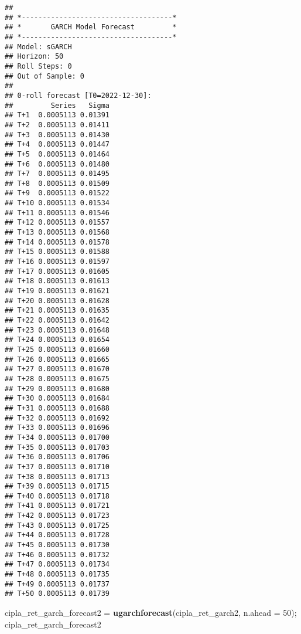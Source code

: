 \documentclass[
]{article}
\newenvironment{Shaded}{\begin{snugshade}}{\end{snugshade}}
\newcommand{\AttributeTok}[1]{\textcolor[rgb]{0.13,0.29,0.53}{#1}}
\newcommand{\DecValTok}[1]{\textcolor[rgb]{0.00,0.00,0.81}{#1}}
\newcommand{\FunctionTok}[1]{\textcolor[rgb]{0.13,0.29,0.53}{\textbf{#1}}}
\newcommand{\NormalTok}[1]{#1}
\newcommand{\OtherTok}[1]{\textcolor[rgb]{0.56,0.35,0.01}{#1}}
\begin{document}
\begin{verbatim}
## 
## *------------------------------------*
## *       GARCH Model Forecast         *
## *------------------------------------*
## Model: sGARCH
## Horizon: 50
## Roll Steps: 0
## Out of Sample: 0
## 
## 0-roll forecast [T0=2022-12-30]:
##         Series   Sigma
## T+1  0.0005113 0.01391
## T+2  0.0005113 0.01411
## T+3  0.0005113 0.01430
## T+4  0.0005113 0.01447
## T+5  0.0005113 0.01464
## T+6  0.0005113 0.01480
## T+7  0.0005113 0.01495
## T+8  0.0005113 0.01509
## T+9  0.0005113 0.01522
## T+10 0.0005113 0.01534
## T+11 0.0005113 0.01546
## T+12 0.0005113 0.01557
## T+13 0.0005113 0.01568
## T+14 0.0005113 0.01578
## T+15 0.0005113 0.01588
## T+16 0.0005113 0.01597
## T+17 0.0005113 0.01605
## T+18 0.0005113 0.01613
## T+19 0.0005113 0.01621
## T+20 0.0005113 0.01628
## T+21 0.0005113 0.01635
## T+22 0.0005113 0.01642
## T+23 0.0005113 0.01648
## T+24 0.0005113 0.01654
## T+25 0.0005113 0.01660
## T+26 0.0005113 0.01665
## T+27 0.0005113 0.01670
## T+28 0.0005113 0.01675
## T+29 0.0005113 0.01680
## T+30 0.0005113 0.01684
## T+31 0.0005113 0.01688
## T+32 0.0005113 0.01692
## T+33 0.0005113 0.01696
## T+34 0.0005113 0.01700
## T+35 0.0005113 0.01703
## T+36 0.0005113 0.01706
## T+37 0.0005113 0.01710
## T+38 0.0005113 0.01713
## T+39 0.0005113 0.01715
## T+40 0.0005113 0.01718
## T+41 0.0005113 0.01721
## T+42 0.0005113 0.01723
## T+43 0.0005113 0.01725
## T+44 0.0005113 0.01728
## T+45 0.0005113 0.01730
## T+46 0.0005113 0.01732
## T+47 0.0005113 0.01734
## T+48 0.0005113 0.01735
## T+49 0.0005113 0.01737
## T+50 0.0005113 0.01739
\end{verbatim}

\begin{Shaded}
\begin{Highlighting}[]
\NormalTok{cipla\_ret\_garch\_forecast2 }\OtherTok{=} \FunctionTok{ugarchforecast}\NormalTok{(cipla\_ret\_garch2, }\AttributeTok{n.ahead =} \DecValTok{50}\NormalTok{); cipla\_ret\_garch\_forecast2}
\end{Highlighting}
\end{Shaded}
\end{document}
